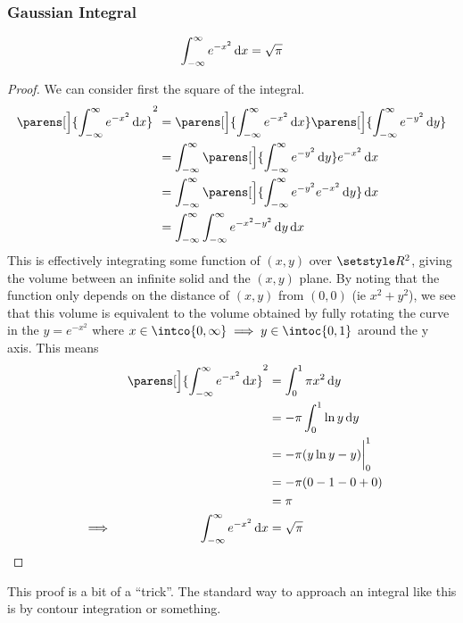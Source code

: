 \subsubsection{Gaussian Integral}

\begin{theorem} \label{thm_gauss_integral}
\begin{equation*}
\integ[-\infty]<\infty>{e^{-x^2}}{x} = \sqrt \pi
\end{equation*}
\end{theorem}
\begin{proof}
We can consider first the square of the integral.
\begin{align*}
    \parens[\Big]{\integ[-\infty]<\infty>{e^{-x^2}}{x}}^2
    &= \parens[\Big]{\integ[-\infty]<\infty>{e^{-x^2}}{x}}
       \parens[\Big]{\integ[-\infty]<\infty>{e^{-y^2}}{y}} \\
    &= \integ[-\infty]<\infty>{
                   \parens[\Big]{\integ[-\infty]<\infty>{e^{-y^2}}{y}}
               e^{-x^2}}{x} \\
    &= \integ[-\infty]<\infty>{
           \parens[\Big]{\integ[-\infty]<\infty>{e^{-y^2} e^{-x^2}}{y}}}{x} \\
    &= \integ[-\infty]<\infty>{
           \integ[-\infty]<\infty>{e^{-x^2-y^2}}{y}}{x}
\end{align*}
This is effectively integrating some function of \((x, y)\) over
\(\Reals^2\), giving the volume between an infinite solid and the \((x, y)\)
plane. By noting that the function only depends on the distance of
\((x, y)\) from \((0, 0)\) (ie \(x^2 + y^2\)), we see that this volume is
equivalent to the volume obtained by fully rotating the curve in the
\(y = e^{-x^2}\) where
\(x \in \intco{0, \infty} \implies y \in \intoc{0, 1}\) around the y axis.
This means
\begin{alignat*}{2}
    && \parens[\Big]{\integ[-\infty]<\infty>{e^{-x^2}}{x}}^2
        &= \integ[0]<1>{\pi x^2}{y} \\
    &&  &= -\pi \integ[0]<1>{\ln y}{y} \\
    &&  &= -\pi (y\ln y - y)\eval_0^1 \\
    &&  &= -\pi (0 - 1 - 0 + 0) \\
    &&  &= \pi \\
    &\implies{}& \integ[-\infty]<\infty>{e^{-x^2}}{x}
        &= \sqrt \pi \qedhere
\end{alignat*}
\end{proof}
This proof is a bit of a ``trick''. The standard way to approach an integral
like this is by contour integration or something.

